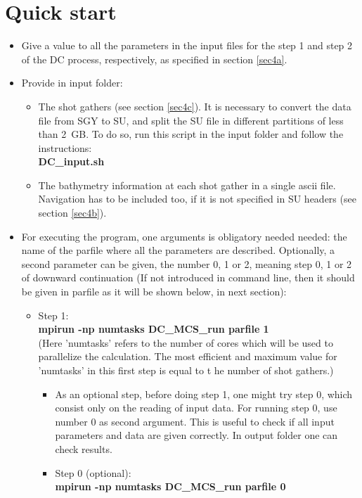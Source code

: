 \documentclass[11pt, oneside]{article}   	%
\begin{document}
\section{Quick start}\label{sec3}
\begin{itemize}
\item Give a value to all the parameters in the input files for the step 1 and step 2 of the DC process, respectively, as specified in section \ref{sec4a}. 
\item Provide in input folder:
\begin{itemize}
\item The shot gathers (see section \ref{sec4c}). It is necessary to convert the data file from SGY to SU, and split the SU file in different partitions of less than 2~GB. To do so, run this script in the input folder and follow the instructions:\\
  \textbf{DC\_input.sh}
\item The bathymetry information at each shot gather in a single ascii file. Navigation has to be included too, if it is not specified in SU headers (see section \ref{sec4b}).
 \end{itemize}
 \item For executing the program, one arguments is obligatory needed needed: the name of the parfile where all the parameters are described. Optionally, a second parameter can be given, the number 0, 1 or 2, meaning step 0, 1 or 2 of downward continuation (If not introduced in command line, then it should be given in parfile as it will be shown below, in next section):
 	\begin{itemize}
	\item Step 1: \\ 
 	\textbf{mpirun -np numtasks DC\_MCS\_run parfile 1}\\
 	(Here 'numtasks' refers to the number of cores which will be used to parallelize the calculation. The most efficient and maximum value for 'numtasks' in this first step is equal to t	he number of shot gathers.)
	 	\begin{itemize}
		\item As an optional step, before doing step 1, one might try step 0, which consist only on the reading of input data. For running step 0, use number 0 as second argument. This is useful to check if all input parameters and data are given correctly. In output folder one can check results.
		\item Step 0 (optional): \\ 
 		\textbf{mpirun -np numtasks DC\_MCS\_run parfile 0}\\
 	 \end{itemize}


\end{itemize}
\end{itemize}
\end{document}
